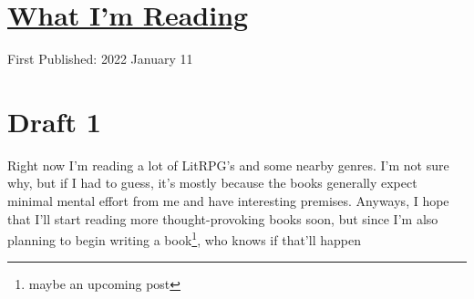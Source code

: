 \documentclass[12pt]{article}[titlepage]
\newcommand{\1}{\={a}}
\newcommand{\2}{\={e}}
\newcommand{\3}{\={\i}}
\newcommand{\4}{\=o}
\newcommand{\5}{\=u}
\newcommand{\6}{\={A}}
\renewcommand{\,}{\textsuperscript{,}}
\begin{document}
\doublespacing
\section{\href{what-im-reading.html}{What I'm Reading}}
First Published: 2022 January 11

\section{Draft 1}
Right now I'm reading a lot of LitRPG's and some nearby genres.
I'm not sure why, but if I had to guess, it's mostly because the books generally expect minimal mental effort from me and have interesting premises.
Anyways, I hope that I'll start reading more thought-provoking books soon, but since I'm also planning to begin writing a book\footnote{maybe an upcoming post}, who knows if that'll happen
\end{document}
